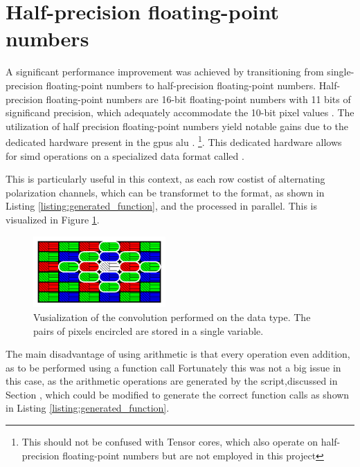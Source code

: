 \section{Half-precision floating-point numbers}
A significant performance improvement was achieved by transitioning from single-precision floating-point numbers to half-precision floating-point numbers.
Half-precision floating-point numbers are 16-bit floating-point numbers with 11 bits of significand precision, which adequately accommodate the 10-bit pixel values \cite{HalfprecisionFloatingpointFormat2023}.
The utilization of half precision floating-point numbers yield notable gains due to the dedicated hardware present in the \gls{gpu}s \gls{alu} \cite{CUDA2023}.
\footnote{This should not be confused with Tensor cores, which also operate on half-precision floating-point numbers but are not employed in this project}.
This dedicated hardware allows for \gls{simd} operations on a specialized data format called  \cite{nvidiaHalf2ArithmeticFunctions2023}.

This is particularly useful in this context, as each row costist of alternating polarization channels, which can be transformet to the  format, as shown in Listing \ref{listing:generated_function}, and the processed in parallel.
This is visualized in Figure \ref{fig:half2_conv}.

\begin{figure}[H]
    \centering
    \includegraphics[width=0.45\textwidth]{figures/polarized_image/half2_conv.pdf}
    \caption{Vusialization of the convolution performed on the  data type. The pairs of pixels encircled are stored in a single  variable.}
    \label{fig:half2_conv}
\end{figure}

The main disadvantage of using  arithmetic is that every operation even addition, as to be performed using a function call \cite{nvidiaHalf2ArithmeticFunctions2023}
Fortunately this was not a big issue in this case, as the arithmetic operations are generated by the \py script,discussed in Section \todo, which could be modified to generate the correct function calls as shown in Listing \ref{listing:generated_function}.


